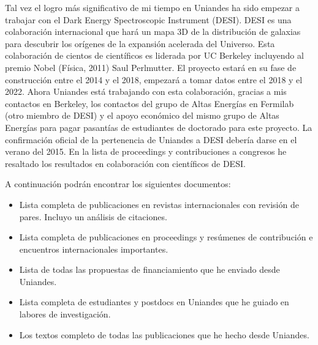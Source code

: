 \documentclass[letterpaper,12pt,onecolumn]{article}
\begin{document}
Tal vez el logro m\'as significativo de mi tiempo en Uniandes ha sido
empezar a trabajar con el Dark Energy Spectroscopic Instrument (DESI). DESI
es una colaboraci\'on internacional que har\'a un mapa 3D de la
distribuci\'on de galaxias para descubrir los or\'igenes de la expansi\'on
acelerada del Universo. Esta colaboraci\'on de cientos de cient\'ificos es
liderada por UC Berkeley incluyendo al premio Nobel (F\'isica, 2011)
Saul Perlmutter. El proyecto estar\'a en su fase de construcci\'on entre el
2014 y el 2018, empezar\'a a tomar datos entre el 2018 y el 2022. Ahora
Uniandes está trabajando con esta colaboraci\'on, gracias a mis
contactos en Berkeley, los contactos del grupo de Altas Energ\'ias en
Fermilab (otro miembro de DESI) y el apoyo econ\'omico del mismo grupo
de Altas Energías para pagar pasant\'ias de estudiantes de doctorado
para este proyecto. La confirmaci\'on oficial de la pertenencia de
Uniandes a DESI deber\'ia darse en el verano del 2015. En la lista de
proceedings y contribuciones a congresos he resaltado los resultados
en colaboraci\'on con cient\'ificos de DESI.

A continuaci\'on podr\'an encontrar los siguientes documentos:

\begin{itemize}
\item Lista completa de publicaciones en revistas internacionales
  con revisi\'on de pares. Incluyo un an\'alisis de citaciones.
\item Lista completa de publicaciones en proceedings y res\'umenes de
  contribuci\'on e encuentros internacionales importantes.
\item Lista de todas las propuestas de financiamiento que he enviado
  desde Uniandes.
\item Lista completa de estudiantes y postdocs en Uniandes que he guiado
  en labores de investigaci\'on. 
\item Los textos completo de todas las publicaciones que he hecho desde
  Uniandes.
\end{itemize}
\end{document}
